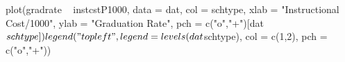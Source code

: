 \begin{Schunk}
\begin{Sinput}
 plot(gradrate ~ instcstP1000, data = dat, col = schtype, xlab = "Instructional Cost/1000", ylab = "Graduation Rate", pch = c("o","+")[dat$schtype])
 legend("topleft", legend = levels(dat$schtype), col = c(1,2), pch = c("o","+"))
\end{Sinput}
\end{Schunk}
